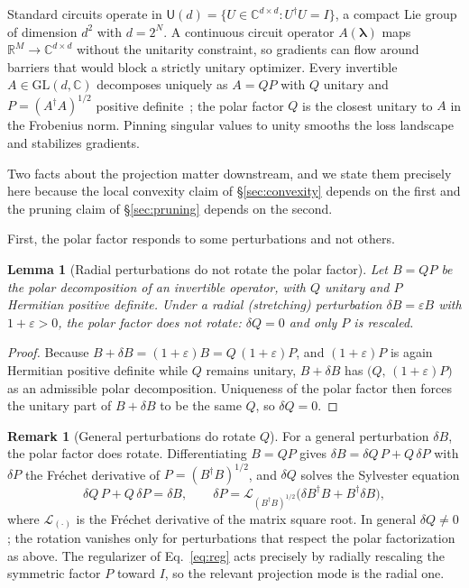 \documentclass[twocolumn,aps,prl,superscriptaddress,showkeys]{revtex4-2}
\theoremstyle{plain}
\newtheorem{lemma}{Lemma}
\theoremstyle{definition}
\newtheorem{remark}{Remark}
\newcommand{\Mat}{\mathbb{C}^{d\times d}}
\newcommand{\GL}{\mathrm{GL}(d,\mathbb{C})}
\newcommand{\Unitary}{\mathsf{U}(d)}
\begin{document}
Standard circuits operate in $\Unitary=\{U\in\Mat: U^\dagger U=I\}$, a compact Lie group of dimension $d^2$ with $d=2^N$. A continuous circuit operator $A(\boldsymbol{\lambda})$ maps $\mathbb{R}^M\to\Mat$ without the unitarity constraint, so gradients can flow around barriers that would block a strictly unitary optimizer. Every invertible $A\in\GL$ decomposes uniquely as $A=QP$ with $Q$ unitary and $P=(A^\dagger A)^{1/2}$ positive definite~\cite[Sec.~8.1]{Golub2013}; the polar factor $Q$ is the closest unitary to $A$ in the Frobenius norm. Pinning singular values to unity smooths the loss landscape and stabilizes gradients.

Two facts about the projection matter downstream, and we state them precisely here because the local convexity claim of \S\ref{sec:convexity} depends on the first and the pruning claim of \S\ref{sec:pruning} depends on the second.

First, the polar factor responds to some perturbations and not others.

\begin{lemma}[Radial perturbations do not rotate the polar factor]
\label{lem:frechet}
Let $B=QP$ be the polar decomposition of an invertible operator, with $Q$ unitary and $P$ Hermitian positive definite. Under a radial (stretching) perturbation $\delta B=\varepsilon B$ with $1+\varepsilon>0$, the polar factor does not rotate: $\delta Q=0$ and only $P$ is rescaled.
\end{lemma}
\begin{proof}
Because $B+\delta B=(1+\varepsilon)B=Q\,(1+\varepsilon)P$, and $(1+\varepsilon)P$ is again Hermitian positive definite while $Q$ remains unitary, $B+\delta B$ has $\bigl(Q,\,(1+\varepsilon)P\bigr)$ as an admissible polar decomposition. Uniqueness of the polar factor then forces the unitary part of $B+\delta B$ to be the same $Q$, so $\delta Q=0$.
\end{proof}

\begin{remark}[General perturbations do rotate $Q$]
\label{rem:frechet-gen}
For a general perturbation $\delta B$, the polar factor does rotate. Differentiating $B=QP$ gives $\delta B=\delta Q\,P+Q\,\delta P$ with $\delta P$ the Fr\'echet derivative of $P=(B^\dagger B)^{1/2}$, and $\delta Q$ solves the Sylvester equation
$$\delta Q\,P+Q\,\delta P=\delta B,\qquad \delta P=\mathcal{L}_{(B^\dagger B)^{1/2}}\!\bigl(\delta B^\dagger B+B^\dagger\delta B\bigr),$$
where $\mathcal{L}_{(\cdot)}$ is the Fr\'echet derivative of the matrix square root. In general $\delta Q\neq 0$; the rotation vanishes only for perturbations that respect the polar factorization as above. The regularizer of Eq.~\eqref{eq:reg} acts precisely by radially rescaling the symmetric factor $P$ toward $I$, so the relevant projection mode is the radial one.
\end{remark}
\end{document}
